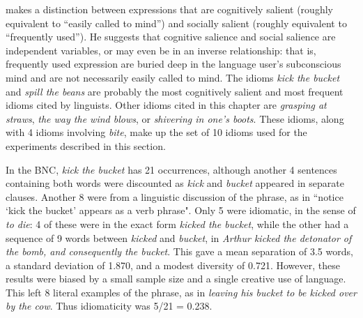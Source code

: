 \documentclass[output=paper]{langsci/langscibook}
\begin{document}
\cite[5,21,214]{hanks2013}  makes a distinction between expressions that
are cognitively salient (roughly equivalent to “easily called to mind”)
and socially salient (roughly equivalent to “frequently used”). He
suggests that cognitive salience and social salience are independent
variables, or may even be in an inverse relationship: that is,
frequently used expression are buried deep in the language user’s
subconscious mind and are not necessarily easily called to mind. The
idioms \textit{kick the bucket} and \textit{spill the beans} are probably the most
cognitively salient and most frequent idioms cited by linguists. Other
idioms cited in this chapter are \textit{grasping at straws}, \textit{the way the
wind blows}, or \textit{shivering in one's boots}. These idioms, along with 4
idioms involving \textit{bite}, make up the set of 10 idioms used for the
experiments described in this section.



In the BNC, \textit{kick the bucket} has 21 occurrences, although another 4
sentences containing both words were discounted as \textit{kick} and \textit{bucket}
appeared in separate clauses. Another 8 were from a linguistic
discussion of the phrase, as in ``notice `kick the bucket' appears as a
verb phrase". Only 5 were idiomatic, in the sense of \textit{to die}: 4 of
these were in the exact form  \textit{kicked the bucket}, while the other had a
sequence of 9 words between \textit{kicked} and \textit{bucket}, in \textit{Arthur kicked
the detonator of the bomb, and consequently the bucket}. This gave a
mean separation of 3.5 words, a standard deviation of 1.870, and a
modest diversity of 0.721. However, these results were biased by a
small sample size and a single creative use of language. This left 8
literal examples of the phrase, as in  \textit{leaving his bucket to be kicked
over by the cow}. Thus idiomaticity was 5/21 = 0.238.
\end{document}
